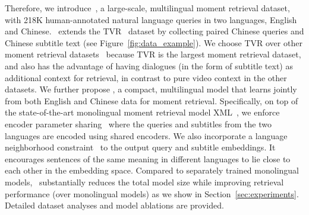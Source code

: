Therefore, we introduce~\DsetName, a large-scale, multilingual moment retrieval dataset, with 218K human-annotated natural language queries in two languages, English and Chinese. 
\DsetName~extends the TVR~\cite{lei2020tvr} dataset by collecting paired Chinese queries and Chinese subtitle text (see Figure~\ref{fig:data_example}).
We choose TVR over other moment retrieval datasets~\cite{Krishna2017DenseCaptioningEI,anne2017localizing,gao2017tall} because TVR is the largest moment retrieval dataset, and also has the advantage of having dialogues (in the form of subtitle text) as additional context for retrieval, in contrast to pure video context in the other datasets.
We further propose \ModelName, a compact, multilingual model that learns jointly from both English and Chinese data for moment retrieval. 
Specifically, on top of the state-of-the-art monolingual moment retrieval model XML~\cite{lei2020tvr}, we enforce encoder parameter sharing~\cite{sachan2018parameter,dong2015multi} where the queries and subtitles from the two languages are encoded using shared encoders. 
We also incorporate a language neighborhood constraint~\cite{wang2018learning,kim2020mule} to the output query and subtitle embeddings. 
It encourages sentences of the same meaning in different languages to lie close to each other in the embedding space.
Compared to separately trained monolingual models, \ModelName~substantially reduces the total model size while improving retrieval performance (over monolingual models) as we show in Section~\ref{sec:experiments}. 
Detailed dataset analyses and model ablations are provided.







